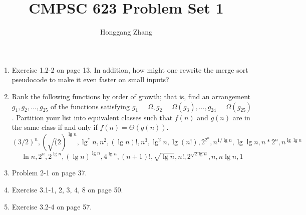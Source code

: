 \documentclass[11pt]{article}
\begin{document}
\title{CMPSC 623 Problem Set 1}
\author{Honggang Zhang}


\flushbottom \oddsidemargin=-0.2in \evensidemargin=-0.2in
\topmargin=-0.2in \headheight=0in \headsep=0in \textwidth=6.5in
\textheight=9.0in
\baselineskip


\maketitle

\begin{enumerate}

\item Exercise 1.2-2 on page 13. In addition, how might one
rewrite the merge sort pseudocode to make it even faster on small
inputs?


\item Rank the following functions by order of growth; that is,
find an arrangement $g_1, g_2, ..., g_25$ of the functions
satisfying $g_1=\Omega, g_2=\Omega(g_3), ...,
g_{24}=\Omega(g_25)$. Partition your list into equivalent classes
such that $f(n)$ and $g(n)$ are in the same class if and only if
$f(n)=\Theta(g(n))$.
$$(3/2)^n, (\sqrt(2)^{\lg n}, \lg^*n, n^2, (\lg n)!, n^3, \lg^2n,
\lg (n!), 2^{2^n}, n^{1/\lg n}, \lg \lg n, n*2^n, n^{\lg \lg n}
$$
$$
\ln n, 2^n, 2^{\lg n}, (\lg n)^{\lg n}, 4^{\lg n}, (n+1)!,
\sqrt{\lg n}, n!, 2^{\sqrt{2\lg n}}, n, n\lg n, 1
$$

\item Problem 2-1 on page 37.

\item Exercise 3.1-1, 2, 3, 4, 8  on page 50.

\item Exercise 3.2-4 on page 57.
\end{enumerate}
\end{document}
